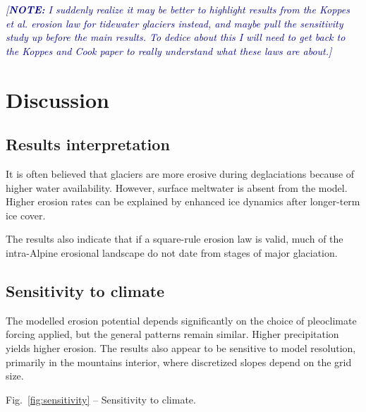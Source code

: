 \documentclass[utf8]{article}
\newcommand{\note}[1]{\textcolor{darkblue}{\emph{[\textbf{NOTE:} #1]}}}
\begin{document}
    \note{I suddenly realize it may be better to highlight results from the
          Koppes et al. erosion law for tidewater glaciers instead, and maybe
          pull the sensitivity study up before the main results. To dedice
          about this I will need to get back to the Koppes and Cook paper to
          really understand what these laws are about.}


\section{Discussion}

\subsection{Results interpretation}

    It is often believed that glaciers are more erosive during deglaciations
    because of higher water availability. However, surface meltwater is absent
    from the model. Higher erosion rates can be explained by enhanced ice
    dynamics after longer-term ice cover.

    The results also indicate that if a square-rule erosion law is valid, much
    of the intra-Alpine erosional landscape do not date from stages of major
    glaciation.

\subsection{Sensitivity to climate}

    The modelled erosion potential depends significantly on the choice of
    pleoclimate forcing applied, but the general patterns remain similar.
    Higher precipitation yields higher erosion. The results also appear to be
    sensitive to model resolution, primarily in the mountains interior, where
    discretized slopes depend on the grid size.

    Fig.~\ref{fig:sensitivity} -- Sensitivity to climate.

\end{document}
